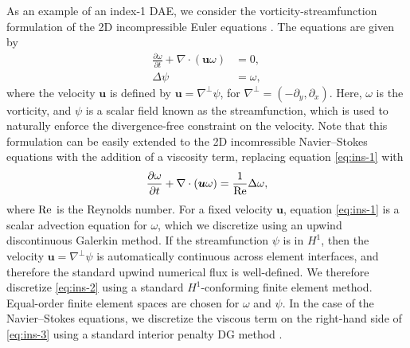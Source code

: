 \documentclass[review]{siamart}
\begin{document}
As an example of an index-1 DAE, we consider the vorticity-streamfunction formulation of the 2D incompressible Euler equations \cite{Liu2000}.
The equations are given by
\begin{align}
	\label{eq:ins-1}
	\frac{\partial\omega}{\partial t} + \nabla\cdot(\bm{u} \omega) &= 0, \\
	\label{eq:ins-2}
	\Delta \psi &= \omega,
\end{align}
where the velocity $\bm u$ is defined by $\bm u = \nabla^\perp \psi$, for $\nabla^\perp = (-\partial_y, \partial_x)$.
Here, $\omega$ is the vorticity, and $\psi$ is a scalar field known as the streamfunction, which is used to naturally enforce the divergence-free constraint on the velocity.
Note that this formulation can be easily extended to the 2D incomressible Navier--Stokes equations with the addition of a viscosity term, replacing equation \eqref{eq:ins-1} with
\begin{equation} \label{eq:ins-3}
	\frac{\partial\omega}{\partial t} + \nabla\cdot(\bm{u} \omega) = \frac{1}{\rm Re} \Delta \omega,
\end{equation}
where $\rm Re$ is the Reynolds number.
For a fixed velocity $\bm u$, equation \eqref{eq:ins-1} is a scalar advection equation for $\omega$, which we discretize using an upwind discontinuous Galerkin method.
If the streamfunction $\psi$ is in $H^1$, then the velocity $\bm u = \nabla^\perp \psi$ is automatically continuous across element interfaces, and therefore the standard upwind numerical flux is well-defined.
We therefore discretize \eqref{eq:ins-2} using a standard $H^1$-conforming finite element method.
Equal-order finite element spaces are chosen for $\omega$ and $\psi$.
In the case of the Navier--Stokes equations, we discretize the viscous term on the right-hand side of \eqref{eq:ins-3} using a standard interior penalty DG method \cite{Arnold1982}.
\end{document}
